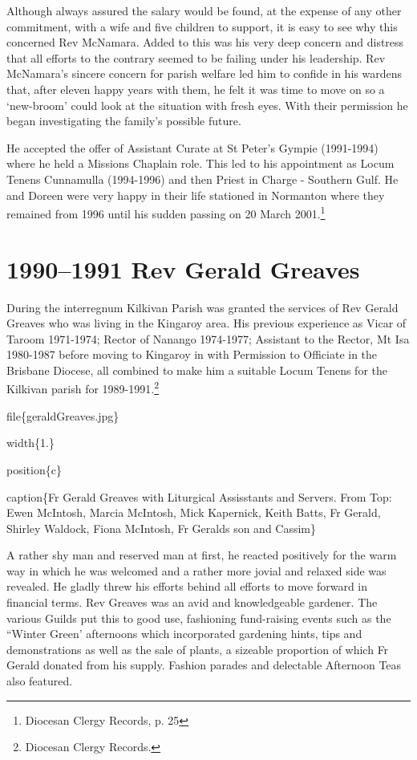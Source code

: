 Although always assured the salary would be found, at the expense of any other commitment, with a wife and five children to support, it is easy to see why this concerned Rev McNamara. Added to this was his very deep concern and distress that all efforts to the contrary seemed to be failing under his leadership. Rev McNamara's sincere concern for parish welfare led him to confide in his wardens that, after eleven happy years with them, he felt it was time to move on so a `new-broom' could look at the situation with fresh eyes. With their permission he began investigating the family's possible future.

He accepted the offer of Assistant Curate at St Peter's Gympie (1991-1994) where he held a Missions Chaplain role. This led to his appointment as Locum Tenens Cunnamulla (1994-1996) and then Priest in Charge - Southern Gulf. He and Doreen were very happy in their life stationed in Normanton where they remained from 1996 until his sudden passing on 20 March 2001.\footnote{Diocesan Clergy Records, p. 25}

\hypertarget{rev-gerald-greaves}{%
\section{1990--1991 Rev Gerald Greaves}\label{rev-gerald-greaves}}

During the interregnum Kilkivan Parish was granted the services of Rev Gerald Greaves who was living in the Kingaroy area. His previous experience as Vicar of Taroom 1971-1974; Rector of Nanango 1974-1977; Assistant to the Rector, Mt Isa 1980-1987 before moving to Kingaroy in with Permission to Officiate in the Brisbane Diocese, all combined to make him a suitable Locum Tenens for the Kilkivan parish for 1989-1991.\footnote{Diocesan Clergy Records.}

file\{geraldGreaves.jpg\}

width\{1.\}

position\{c\}

caption\{Fr Gerald Greaves with Liturgical Assisstants and Servers. From Top: Ewen McIntosh, Marcia McIntosh, Mick Kapernick, Keith Batts, Fr Gerald, Shirley Waldock, Fiona McIntosh, Fr Geralds son and Cassim\}

A rather shy man and reserved man at first, he reacted positively for the warm way in which he was welcomed and a rather more jovial and relaxed side was revealed. He gladly threw his efforts behind all efforts to move forward in financial terms. Rev Greaves was an avid and knowledgeable gardener. The various Guilds put this to good use, fashioning fund-raising events such as the ``Winter Green' afternoons which incorporated gardening hints, tips and demonstrations as well as the sale of plants, a sizeable proportion of which Fr Gerald donated from his supply. Fashion parades and delectable Afternoon Teas also featured.

